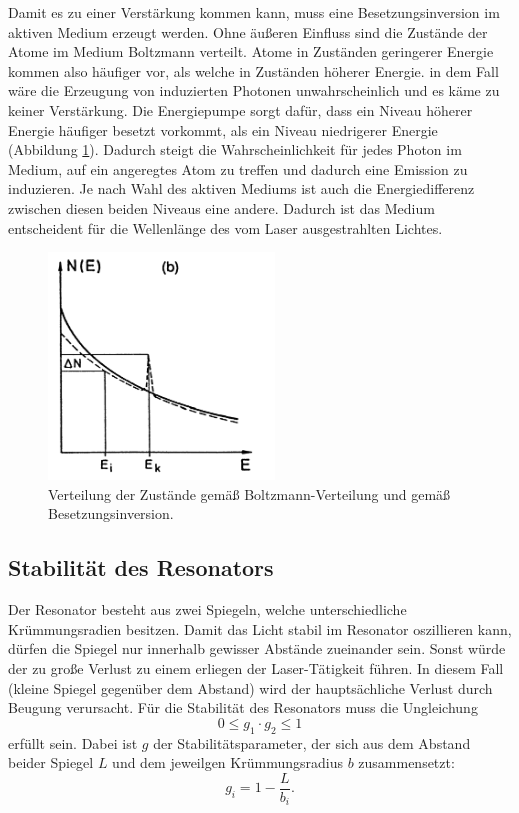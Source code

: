 Damit es zu einer Verstärkung kommen kann, muss eine Besetzungsinversion im aktiven Medium erzeugt werden. Ohne äußeren Einfluss sind die Zustände der Atome im Medium Boltzmann verteilt. Atome in Zuständen geringerer Energie kommen also häufiger vor, als welche in Zuständen höherer Energie. in dem Fall wäre die Erzeugung von induzierten Photonen unwahrscheinlich und es käme zu keiner Verstärkung.
Die Energiepumpe sorgt dafür, dass ein Niveau höherer Energie häufiger besetzt vorkommt, als ein Niveau niedrigerer Energie (Abbildung \ref{fig:inv}). Dadurch steigt die Wahrscheinlichkeit für jedes Photon im Medium, auf ein angeregtes Atom zu treffen und dadurch eine Emission zu induzieren. Je nach Wahl des aktiven Mediums ist auch die Energiedifferenz zwischen diesen beiden Niveaus eine andere. Dadurch ist das Medium entscheident für die Wellenlänge des vom Laser ausgestrahlten Lichtes.

\begin{figure}
    \centering
    \includegraphics[width=6cm]{Bilder/Inversion.PNG}
    \caption{Verteilung der Zustände gemäß Boltzmann-Verteilung und gemäß Besetzungsinversion.\cite{Laserspektroskopie_1}}
    \label{fig:inv}
\end{figure}

\subsection{Stabilität des Resonators}
Der Resonator besteht aus zwei Spiegeln, welche unterschiedliche Krümmungsradien besitzen. Damit das Licht stabil im Resonator oszillieren kann, dürfen die Spiegel nur innerhalb gewisser Abstände zueinander sein. Sonst würde der zu große Verlust zu einem erliegen der Laser-Tätigkeit führen. In diesem Fall (kleine Spiegel gegenüber dem Abstand) wird der hauptsächliche Verlust durch Beugung verursacht.
Für die Stabilität des Resonators muss die Ungleichung
\begin{equation}
    \label{eqn:g}
   0 \leq g_1 \cdot g_2 \leq 1
\end{equation}
erfüllt sein. Dabei ist $g$ der Stabilitätsparameter, der sich aus dem Abstand beider Spiegel $L$ und dem jeweilgen Krümmungsradius $b$ zusammensetzt:
\begin{equation}
    g_i = 1-\frac{L}{b_i}.
\end{equation}

